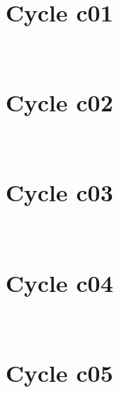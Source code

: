 \documentclass[a4paper,twoside,11pt]{article}
\begin{document}
\section{Cycle c01}

\begin{tabular}{lrlrlr}

\end{tabular}

\begin{tabular}{lrlrlr}

\end{tabular}



\section{Cycle c02}

\begin{tabular}{lrlrlr}

\end{tabular}

\begin{tabular}{lrlrlr}

\end{tabular}



\section{Cycle c03}

\begin{tabular}{lrlrlr}

\end{tabular}

\begin{tabular}{lrlrlr}

\end{tabular}



\section{Cycle c04}

\begin{tabular}{lrlrlr}

\end{tabular}

\begin{tabular}{lrlrlr}

\end{tabular}



\section{Cycle c05}

\begin{tabular}{lrlrlr}

\end{tabular}

\begin{tabular}{lrlrlr}

\end{tabular}
\end{document}
